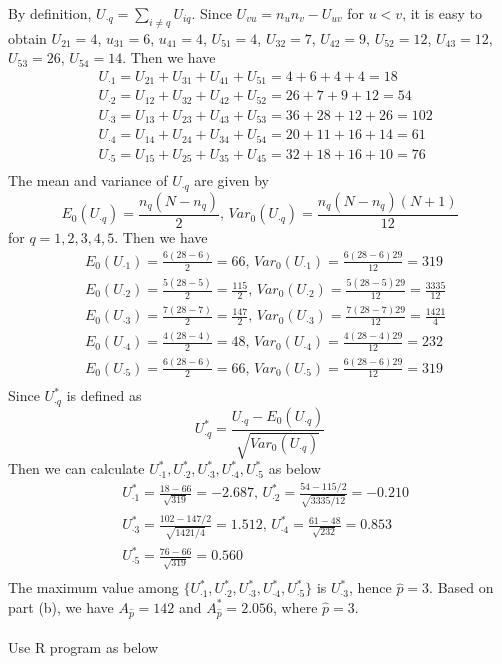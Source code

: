 \documentclass[12pt,a4paper]{article}
\begin{document}
By definition, $U_{\cdot q}=\sum_{i\neq q}U_{iq}$. Since  $U_{vu}=n_{u}n_{v}-U_{uv}$ for $u<v$, it is easy to obtain $U_{21}=4$, $u_{31}=6$, $u_{41}=4$, $U_{51}=4$, $U_{32}=7$, $U_{42}=9$, $U_{52}=12$, $U_{43}=12$, $U_{53}=26$, $U_{54}=14$. Then we have
\begin{align*}
&U_{\cdot 1}=U_{21}+U_{31}+U_{41}+U_{51}=4+6+4+4=18\\
&U_{\cdot 2}=U_{12}+U_{32}+U_{42}+U_{52}=26+7+9+12=54\\
&U_{\cdot 3}=U_{13}+U_{23}+U_{43}+U_{53}=36+28+12+26=102\\
&U_{\cdot 4}=U_{14}+U_{24}+U_{34}+U_{54}=20+11+16+14=61\\
&U_{\cdot 5}=U_{15}+U_{25}+U_{35}+U_{45}=32+18+16+10=76\\
\end{align*}
The mean and variance of $U_{\cdot q}$ are given by $$E_{0}(U_{\cdot q})=\frac{n_{q}(N-n_{q})}{2} \text{, } Var_{0}(U_{\cdot q})=\frac{n_{q}(N-n_{q})(N+1)}{12}$$ for $q=1,2,3,4,5$. Then we have
\begin{align*}
&E_{0}(U_{\cdot 1})=\frac{6(28-6)}{2}=66 \text{, } Var_{0}(U_{\cdot 1})=\frac{6(28-6)29}{12}=319\\
&E_{0}(U_{\cdot 2})=\frac{5(28-5)}{2}=\frac{115}{2} \text{, } Var_{0}(U_{\cdot 2})=\frac{5(28-5)29}{12}=\frac{3335}{12}\\
&E_{0}(U_{\cdot 3})=\frac{7(28-7)}{2}=\frac{147}{2} \text{, } Var_{0}(U_{\cdot 3})=\frac{7(28-7)29}{12}=\frac{1421}{4}\\
&E_{0}(U_{\cdot 4})=\frac{4(28-4)}{2}=48 \text{, } Var_{0}(U_{\cdot 4})=\frac{4(28-4)29}{12}=232\\
&E_{0}(U_{\cdot 5})=\frac{6(28-6)}{2}=66 \text{, } Var_{0}(U_{\cdot 5})=\frac{6(28-6)29}{12}=319\\
\end{align*}
Since $U_{\cdot q}^{*}$ is defined as $$U_{\cdot q}^{*}=\frac{U_{\cdot q}-E_{0}(U_{\cdot q})}{\sqrt{Var_{0}(U_{\cdot q})}}$$
Then we can calculate $U_{\cdot 1}^{*},U_{\cdot 2}^{*},U_{\cdot 3}^{*},U_{\cdot 4}^{*},U_{\cdot 5}^{*}$ as below
\begin{align*}
&U_{\cdot 1}^{*}=\frac{18-66}{\sqrt{319}}=-2.687 \text{, } U_{\cdot 2}^{*}=\frac{54-115/2}{\sqrt{3335/12}}=-0.210\\
&U_{\cdot 3}^{*}=\frac{102-147/2}{\sqrt{1421/4}}=1.512 \text{, } U_{\cdot 4}^{*}=\frac{61-48}{\sqrt{232}}=0.853\\
&U_{\cdot 5}^{*}=\frac{76-66}{\sqrt{319}}=0.560\\
\end{align*}
The maximum value among $\{U_{\cdot 1}^{*},U_{\cdot 2}^{*},U_{\cdot 3}^{*},U_{\cdot 4}^{*},U_{\cdot 5}^{*}\}$ is $U_{\cdot 3}^{*}$, hence $\hat{p}=3$. Based on part (b), we have $A_{\hat{p}}=142$ and $A_{\hat{p}}^{*}=2.056$, where $\hat{p}=3$.\\
~\\
Use R program as below\\
\end{document}
